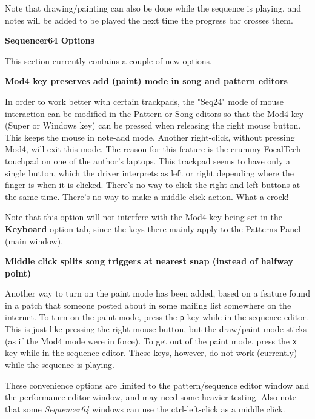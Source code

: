    Note that drawing/painting can also be done while the sequence is playing,
   and notes will be added to be played the next time the progress bar crosses
   them.

   \textbf{Sequencer64 Options}

   This section currently contains a couple of new options.

   \label{new_mod4_mode}
   \textbf{Mod4 key preserves add (paint) mode in song and pattern editors}

   In order to work better with certain trackpads, the
   "Seq24" mode of mouse interaction can be modified in the
   Pattern or Song editors so that the Mod4 key (Super or Windows key)
   can be pressed when releasing the right mouse button.
   This keeps the mouse in note-add mode.
   Another right-click, without pressing Mod4, will exit this mode.
   The reason for this feature is the crummy FocalTech touchpad on one of
   the author's laptops.  This trackpad seems to have only a single button,
   which the driver interprets as left or right depending where the finger
   is when it is clicked.  There's no way to click the right and left
   buttons at the same time.  There's no way to make a middle-click action.
   What a crock!

   Note that this option will not interfere with the Mod4 key being set
   in the \textbf{Keyboard} option tab, since the keys there mainly apply to
   the Patterns Panel (main window).

   \label{new_split_mode}
   \textbf{Middle click splits song triggers at nearest snap (instead of
   halfway point)}


   Another way to turn on the paint mode has been added, based on a feature
   found in a patch that someone posted about in some mailing list somewhere on
   the internet.
   To turn on the paint mode, press the
   \texttt{p} key while in the sequence editor.
   This is just like pressing the right mouse button, but the draw/paint mode
   sticks (as if the Mod4 mode were in force).
   To get out of the paint mode, press the
   \texttt{x} key while in the sequence editor.
   These keys, however, do not work (currently) while the sequence is playing.

   These convenience options are limited to the
   pattern/sequence editor window and the performance editor window, and may
   need some heavier testing.  Also note that some \textsl{Sequencer64} windows
   can use the ctrl-left-click as a middle click. 
 
